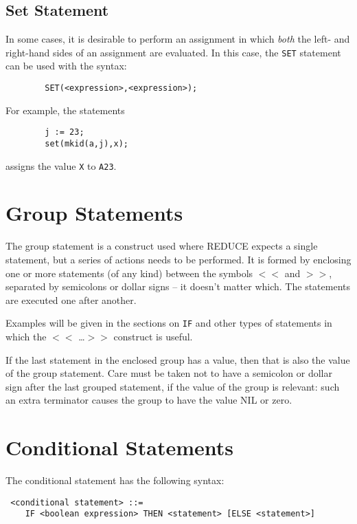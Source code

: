 \documentclass[11pt,letterpaper]{book}
\makeatletter
\newcommand{\REDUCE}{REDUCE}
\newcommand{\underscore}{\_}
\newcommand{\ttindex}[1]{{\renewcommand{\_}{\protect\underscore}%
                          \index{#1@{\tt #1}}}}
\makeatother
\begin{document}
\subsection{Set Statement}

In some cases, it is desirable to perform an assignment in which {\em both\/}
the left- and right-hand sides of an assignment are
evaluated.  In this case, the {\tt SET}\ttindex{SET} statement can be used
with the syntax:

{\small\begin{verbatim}
        SET(<expression>,<expression>);
\end{verbatim}}
For example, the statements
{\small\begin{verbatim}
        j := 23;
        set(mkid(a,j),x);
\end{verbatim}}
assigns the value {\tt X} to {\tt A23}.

\section{Group Statements}

The group statement is a construct used where
{\REDUCE} expects a single statement, but a series of actions needs to be
performed.  It is formed by enclosing one or more statements (of any kind)
between the symbols {\tt $<<$} and {\tt $>>$}, separated by semicolons or
dollar signs -- it doesn't matter which.  The statements are executed one
after another.

Examples will be given in the sections on {\tt IF}\ttindex{IF} and other
types of statements in which the {\tt $<<$} \ldots {\tt $>>$} construct is
useful.

If the last statement in the enclosed group has a value, then that is also
the value of the group statement.  Care must be taken not to have a
semicolon or dollar sign after the last grouped statement, if the value of
the group is relevant: such an extra terminator causes the group to have
the value NIL or zero.

\section{Conditional Statements}

The conditional statement has the following
syntax:

{\small\begin{verbatim}
 <conditional statement> ::=
    IF <boolean expression> THEN <statement> [ELSE <statement>]
\end{verbatim}}
\end{document}
